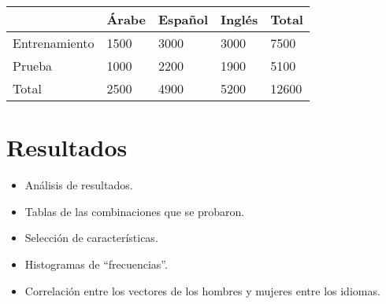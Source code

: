 \documentclass[runningheads]{llncs}
\begin{document}
\begin{table}[]
\centering
\begin{tabular}{|l|l|l|l|l|}
\hline
              & Árabe & Español & Inglés & Total \\ \hline
Entrenamiento & 1500  & 3000    & 3000   & 7500  \\ \hline
Prueba        & 1000  & 2200    & 1900   & 5100  \\ \hline
Total         & 2500  & 4900    & 5200   & 12600 \\ \hline
\end{tabular}
\end{table}
\section{Resultados}

\begin{itemize}
    \item Análisis de resultados.
    \item Tablas de las combinaciones que se probaron.
    \item Selección de características.
    \item Histogramas de ``frecuencias''.
    \item Correlación entre los vectores de los hombres y mujeres
    entre los idiomas.
\end{itemize}
\end{document}

